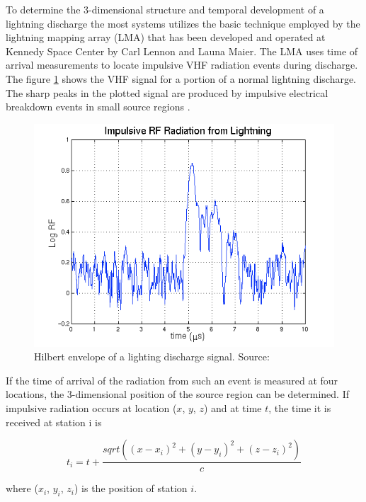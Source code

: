 \documentclass[twoside]{ctuthesis}
\theoremstyle{plain}
\theoremstyle{definition}
\theoremstyle{note}
\begin{document}
To determine the 3-dimensional structure and temporal development of a lightning discharge the most systems utilizes the basic technique employed by the lightning mapping array (LMA) that has been developed and operated at Kennedy Space Center by Carl Lennon and Launa Maier. The LMA uses time of arrival measurements to locate impulsive VHF radiation events during discharge. The figure \ref{fig:lihting_discharge} shows the VHF signal for a portion of a normal lightning discharge. The sharp peaks in the plotted signal are produced by impulsive electrical breakdown events in small source regions \cite{NMLMA}. 

\begin{figure}
 \begin{center}
 \includegraphics[width=\linewidth]{./img/lightning_waveform.png}
 \caption{Hilbert envelope of a lighting discharge signal. Source: \cite{NMLMA} }
  \label{fig:lihting_discharge} 
 \end{center}
\end{figure}

If the time of arrival of the radiation from such an event is measured at four locations, the 3-dimensional position of the source region can be determined. If impulsive radiation occurs at location ($x$, $y$, $z$) and at time $t$, the time it is received at station i is 

\begin{equation}
t_i = t+ \frac{sqrt( (x-x_i)^2 + (y-y_i)^2 +(z-z_i)^2)}{c} \label{toa}
\end{equation}

where ($x_i$, $y_i$, $z_i$) is the position of station $i$. 
\end{document}
